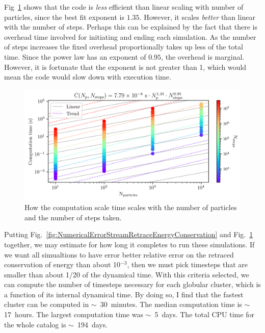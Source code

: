         Fig~\ref{fig:NumericalErrorComputationTimeScalingForStreams} shows that the code is \textit{less} efficient than linear scaling with number of particles, since the best fit exponent is $1.35$. However, it scales \textit{better} than linear with the number of steps. Perhaps this can be explained by the fact that there is overhead time involved for initiating and ending each simulation. As the number of steps increases the fixed overhead proportionally takes up less of the total time. Since the power law has an exponent of $0.95$, the overhead is marginal. However, it is fortunate that the exponent is not greater than 1, which would mean the code would slow down with execution time. 
        \begin{figure}
            \centering
            \includegraphics[width=\linewidth]{images/NumericalErrorComputationTimeScalingForStreams.png}
            \caption[Profiling \texttt{tstrippy}'s computation time for the number of particles and time steps]{How the computation scale time scales with the number of particles and the number of steps taken.}
            \label{fig:NumericalErrorComputationTimeScalingForStreams}
        \end{figure}
        Putting Fig.~\ref{fig:NumericalErrorStreamRetraceEnergyConservation} and Fig.~\ref{fig:NumericalErrorComputationTimeScalingForStreams} together, we may estimate for how long it completes to run these simulations. If we want all simualtions to have error better relative error on the retraced conservation of energy than about 10$^{-3}$, then we must pick timesteps that are smaller than about 1/20 of the dynamical time. With this criteria selected, we can compute the number of timesteps necessary for each globular cluster, which is a function of its internal dynamical time. By doing so, I find that the fastest cluster can be computed in $\sim$~30~minutes. The median computation time is $\sim$17~hours. The largest computation time was $\sim$~5~days. The total CPU time for the whole catalog is $\sim$~194~days. 

